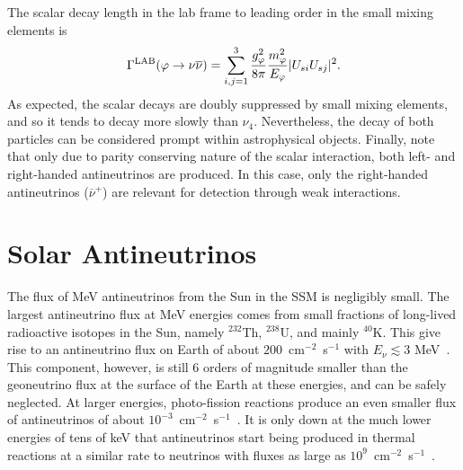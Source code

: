 \documentclass[
reprint,
superscriptaddress,
showpacs,
preprintnumbers,
nofootinbib,
nobibnotes,
amsmath,
amssymb, 
aps,
prd,
floatfix
]{revtex4-1}
\renewcommand{\phi}{\varphi}
\begin{document}
The scalar decay length in the lab frame to leading order in the small mixing elements is
\begin{equation}
    \Gamma^{\rm LAB} (\phi \to \nu \overline{\nu}) = \sum_{i,j=1}^3\frac{g_\phi^2}{8\pi} \frac{m_\phi^2}{E_\phi} |U_{s i}U_{s j}|^2.
\end{equation}
As expected, the scalar decays are doubly suppressed by small mixing elements, and so it tends to decay more slowly than $\nu_4$. Nevertheless, the decay of both particles can be considered prompt within astrophysical objects. Finally, note that only due to parity conserving nature of the scalar interaction, both left- and right-handed antineutrinos are produced. In this case, only the right-handed antineutrinos ($\overline{\nu}^+$) are relevant for detection through weak interactions.

\section{Solar Antineutrinos}\label{sec:solantinus}

The flux of MeV antineutrinos from the Sun in the SSM is negligibly small. The largest antineutrino flux at MeV energies comes from small fractions of long-lived radioactive isotopes in the Sun, namely $^{232}$Th, $^{238}$U, and mainly $^{40}$K. This give rise to an antineutrino flux on Earth of about $200$~cm$^{-2}$~s$^{-1}$ with $E_\nu \lesssim 3$ MeV~\cite{Malaney:1989hs}. This component, however, is still 6 orders of magnitude smaller than the geoneutrino flux at the surface of the Earth at these energies, and can be safely neglected. At larger energies, photo-fission reactions produce an even smaller flux of antineutrinos of about $10^{-3}$~cm$^{-2}$~s$^{-1}$~\cite{Malaney:1989hs}. It is only down at the much lower energies of tens of keV that antineutrinos start being produced in thermal reactions at a similar rate to neutrinos with fluxes as large as $10^9$~cm$^{-2}$~s$^{-1}$~\cite{Vitagliano:2017odj}.
\end{document}
